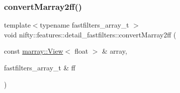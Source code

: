 \subsubsection{\texorpdfstring{convert\+Marray2ff()}{convertMarray2ff()}}
{\footnotesize\ttfamily template$<$typename fastfilters\+\_\+array\+\_\+t $>$ \\
void nifty\+::features\+::detail\+\_\+fastfilters\+::convert\+Marray2ff (\begin{DoxyParamCaption}\item[{const \hyperlink{classandres_1_1View}{marray\+::\+View}$<$ float $>$ \&}]{array,  }\item[{fastfilters\+\_\+array\+\_\+t \&}]{ff }\end{DoxyParamCaption})}

